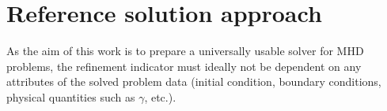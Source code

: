 \section{Reference solution approach}
As the aim of this work is to prepare a universally usable solver for MHD problems, the refinement indicator  must ideally not be dependent on any attributes of the solved problem data (initial condition, boundary conditions, physical quantities such as $\gamma$, etc.).
